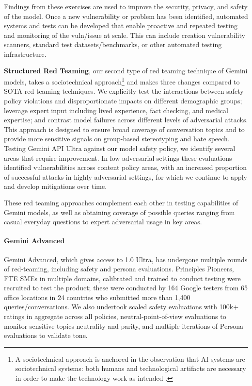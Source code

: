 Findings from these exercises are used to improve the security, privacy, and safety of the model. Once a new vulnerability or problem has been identified, automated systems and tests can be developed that enable proactive and repeated testing and monitoring of the vuln/issue at scale. This can include creation vulnerability scanners, standard test datasets/benchmarks, or other automated testing infrastructure. 

\textbf{Structured Red Teaming}, our second type of red teaming technique of Gemini models, takes a sociotechnical approach\footnote{A sociotechnical approach is anchored in the observation that AI systems are sociotechnical systems: both humans and technological artifacts are necessary in order to make the technology work as intended \citep{Selbst2019}.} and makes three changes compared to SOTA red teaming techniques. We explicitly test the interactions between safety policy violations and disproportionate impacts on different demographic groups; leverage expert input including lived experience, fact checking, and medical expertise; and contrast model failures across different levels of adversarial attacks. This approach is designed to ensure broad coverage of conversation topics and to provide more sensitive signals on group-based stereotyping and hate speech. Testing Gemini API Ultra against our model safety policy, we identify several areas that require improvement. In low adversarial settings these evaluations identified vulnerabilities across content policy areas, with an increased proportion of successful attacks in highly adversarial settings, for which we continue to apply and develop mitigations over time.

These red teaming approaches complement each other in testing capabilities of Gemini models, as well as obtaining coverage of possible queries ranging from casual everyday questions to expert adversarial usage in key areas.

\paragraph{Gemini Advanced}

Gemini Advanced, which gives access to 1.0 Ultra, has undergone multiple rounds of red-teaming, including safety and persona evaluations. Principles Pioneers, FTE SMEs in multiple domains, calibrated and trained to conduct testing were recruited to test the product; these were conducted by 164 Google testers from 65 office locations in 24 countries who submitted more than 1,400 queries/conversations. We also undertook scaled safety evaluations with 100k+ ratings in aggregate across all policies, neutral-point-of-view evaluations to monitor sensitive topics neutrality and parity, and multiple iterations of Persona evaluations to validate tone. 

